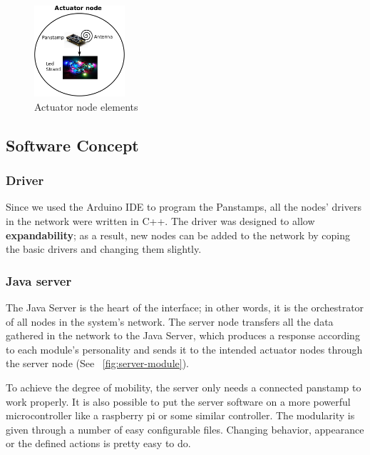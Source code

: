 \begin{figure}[h!]
 \centering
 \includegraphics[width= 0.3\textwidth, clip=true  ,keepaspectratio=true]{./graph/actuator_node.png}
 \caption{Actuator node elements}
 \label{fig:actuator-node}
\end{figure}



\subsection{Software Concept} 

\subsubsection{Driver} 
Since we used the Arduino IDE to program the Panstamps, all the nodes' drivers in the network were written in C++. The driver was designed to allow \textbf{expandability}; as a result, new nodes can be added to the network by coping the basic drivers and changing them slightly. 


\subsubsection{Java server}

The Java Server is the heart of the interface; in other words, it is the orchestrator of all nodes in the system's network. The server node transfers all the data gathered in the network to the Java Server, which produces a response according to each module's personality and sends it to the intended actuator nodes through the server node (See ~\ref{fig:server-module}).  



To achieve the degree of mobility, the server only needs a connected panstamp to work properly. It is also possible to put the server software on a more powerful microcontroller like a raspberry pi or some similar controller.
The modularity is given through a number of easy configurable files. Changing behavior, appearance or the defined actions is pretty easy to do.

